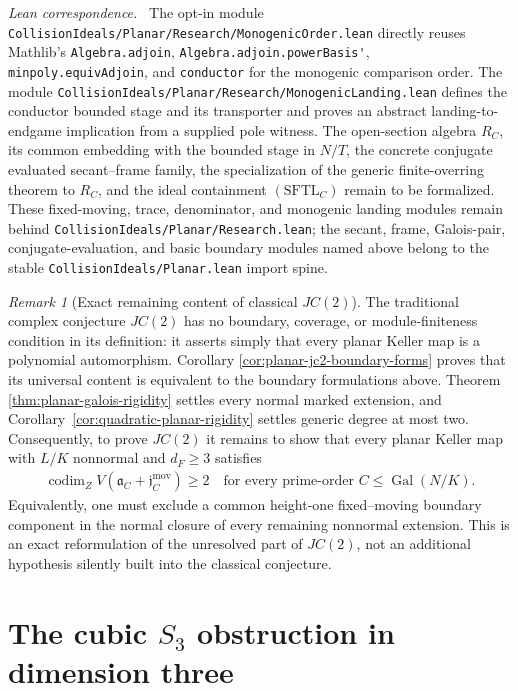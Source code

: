 \documentclass[11pt]{article}
\theoremstyle{remark}
\newtheorem*{remark}{Remark}
\theoremstyle{definition}
\DeclareMathOperator{\Gal}{Gal}
\newcommand{\leanpath}[1]{\texttt{\nolinkurl{#1}}}
\newenvironment{leanfiles}
  {\par\medskip\begingroup\footnotesize\raggedright\noindent
   \textit{Lean correspondence.}\ }
  {\par\endgroup\medskip}
\begin{document}
\begin{leanfiles}
The opt-in module
\leanpath{CollisionIdeals/Planar/Research/MonogenicOrder.lean} directly
reuses Mathlib's \leanpath{Algebra.adjoin},
\leanpath{Algebra.adjoin.powerBasis'}, \leanpath{minpoly.equivAdjoin}, and
\leanpath{conductor} for the monogenic comparison order.  The module
\leanpath{CollisionIdeals/Planar/Research/MonogenicLanding.lean} defines the
conductor bounded stage and its transporter and proves an abstract
landing-to-endgame implication from a supplied pole witness.  The
open-section algebra \(R_C\), its common embedding with the bounded stage in
\(N/T\), the concrete conjugate evaluated secant--frame family, the
specialization of the generic finite-overring theorem to \(R_C\), and the
ideal containment \((\mathrm{SFTL}_C)\) remain to be formalized.  These
fixed-moving, trace, denominator, and monogenic landing modules remain
behind \leanpath{CollisionIdeals/Planar/Research.lean}; the secant, frame,
Galois-pair, conjugate-evaluation, and basic boundary modules named above
belong to the stable \leanpath{CollisionIdeals/Planar.lean} import spine.
\end{leanfiles}

\begin{remark}[Exact remaining content of classical \(JC(2)\)]
\label{rem:exact-remaining-jc2}
The traditional complex conjecture \(JC(2)\) has no boundary, coverage, or
module-finiteness condition in its definition: it asserts simply that every
planar Keller map is a polynomial automorphism.  Corollary
\ref{cor:planar-jc2-boundary-forms} proves that its universal content is
equivalent to the boundary formulations above.  Theorem
\ref{thm:planar-galois-rigidity} settles every normal marked extension, and
Corollary~\ref{cor:quadratic-planar-rigidity} settles generic degree at most
two.  Consequently, to prove \(JC(2)\) it remains to show that every planar
Keller map with \(L/K\) nonnormal and \(d_F\geq3\) satisfies
\[
  \begin{gathered}
    \operatorname{codim}_Z
    V\!\left(\mathfrak a_C+\mathfrak j_C^{\mathrm{mov}}\right)\geq2
    \quad\text{for every prime-order }C\leq\Gal(N/K).
  \end{gathered}
\]
Equivalently, one must exclude a common height-one fixed--moving boundary
component in the normal closure of every remaining nonnormal extension.
This is an exact
reformulation of the unresolved part of \(JC(2)\), not an additional
hypothesis silently built into the classical conjecture.
\end{remark}

\section{\texorpdfstring{The cubic \(S_3\) obstruction in dimension three}
  {The cubic S3 obstruction in dimension three}}
\label{sec:cubic-s3-obstruction}
\end{document}
